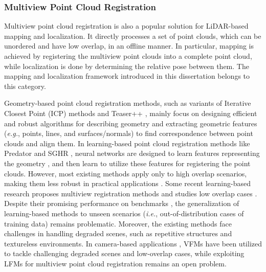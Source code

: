 \subsubsection{Multiview Point Cloud Registration}
Multiview point cloud registration \cite{sghr,multiview,multiway,mdgd} is also a popular solution for LiDAR-based mapping and localization. It directly processes a set of point clouds, which can be unordered and have low overlap, in an offline manner. In particular, mapping is achieved by registering the multiview point clouds into a complete point cloud, while localization is done by determining the relative pose between them. The mapping and localization framework introduced in this dissertation belongs to this category.
\par
Geometry-based point cloud registration methods, such as variants of Iterative Closest Point (ICP) methods \cite{kiss,lloam} and Teaser++ \cite{teaser}, mainly focus on designing efficient and robust algorithms for describing geometry and extracting geometric features (\textit{e.g.}, points, lines, and surfaces/normals) to find correspondence between point clouds and align them. In learning-based point cloud registration methods like Predator \cite{pre} and SGHR \cite{sghr}, neural networks are designed to learn features representing the geometry \cite{features,multiview,3dmatch,se3et,geotransformer}, and then learn to utilize these features for registering the point clouds. However, most existing methods \cite{kiss,lloam,features,3dmatch} apply only to high overlap scenarios, making them less robust in practical applications \cite{pre}. Some recent learning-based research proposes multiview registration methods \cite{sghr,multiview,multiway} and studies low overlap cases \cite{pre,sghr}. Despite their promising performance on benchmarks \cite{3dmatch,eth,scan}, the generalization of learning-based methods to unseen scenarios (\textit{i.e.}, out-of-distribution cases of training data) remains problematic. Moreover, the existing methods \cite{mdgd,sghr,se3et,geotransformer,teaser} face challenges in handling degraded scenes, such as repetitive structures and textureless environments. In camera-based applications \cite{munoz,qingdao,munoz2019}, VFMs have been utilized to tackle challenging degraded scenes and low-overlap cases, while exploiting LFMs for multiview point cloud registration remains an open problem.
